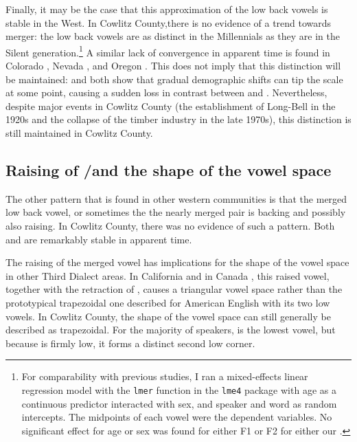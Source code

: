Finally, it may be the case that this approximation of the low back vowels is stable in the West. In Cowlitz County,there is no evidence of a trend towards merger: the low back vowels are as distinct in the Millennials as they are in the Silent generation.\footnote{For comparability with previous studies, I ran a mixed-effects linear regression model with the \texttt{lmer} function in the \texttt{lme4} package \citep{bates_etal_2015_lme4} with age as a continuous predictor interacted with sex, and speaker and word as random intercepts. The midpoints of each vowel were the dependent variables. No significant effect for age or sex was found for either F1 or F2 for either \lot our \thought.} A similar lack of convergence in apparent time is found in Colorado \citep[18]{holland_brandenburg_2017_pads}, Nevada \citep[148]{fridland_kendall_2017_pads}, and Oregon \citep[115]{becker_etal_2016_pads}. This does not imply that this distinction will be maintained: \citet{herold_1990_diss} and \citet{johnson_2010_pads} both show that gradual demographic shifts can tip the scale at some point, causing a sudden loss in contrast between \lot and \thought. Nevertheless, despite major events in Cowlitz County (the establishment of Long-Bell in the 1920s and the collapse of the timber industry in the late 1970s), this distinction is still maintained in Cowlitz County.

\subsection{Raising of \lot/\thought and the shape of the vowel space}

The other pattern that is found in other western communities is that the merged low back vowel, or sometimes the the nearly merged pair \citep[19]{holland_brandenburg_2017_pads} is backing and possibly also raising. In Cowlitz County, there was no evidence of such a pattern. Both \lot and \thought are remarkably stable in apparent time.

The raising of the merged vowel has implications for the shape of the vowel space in other Third Dialect areas. In California \citep[23--24]{donofrio_etal_2017_pads} and in Canada \citep{boberg_2011}, this raised vowel, together with the retraction of \trap, causes a triangular vowel space rather than the prototypical trapezoidal one described for American English with its two low vowels. In Cowlitz County, the shape of the vowel space can still generally be described as trapezoidal. For the majority of speakers, \trap is the lowest vowel, but because \thought is firmly low, it forms a distinct second low corner.

